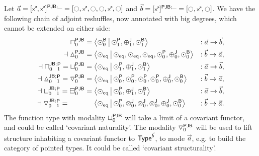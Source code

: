 \documentclass[a4paper]{memoir}
\begin{document}
\begin{example} \label{ex:pjb-paramty}
	Let $\vec a = \maskopypolar{[\ypolar, \ypolar]}{\maskpjb} = [\npolar, \ypolar, \npolar, \npolar, \ypolar, \npolar]$ and $\vec b = \maskopypolar{[\ypolar]}{\maskpjb} = [\npolar, \ypolar, \npolar]$.
	We have the following chain of adjoint reshuffles, now annotated with big degrees, which cannot be extended on either side:
	\begin{align*}
		\cohpi_0^{\maskopfont{PJB}} &= \reshlist{\nwbridgepol_0}{\nwpathpol_1, \nwpospol_1, \nwbridgepol_1} &: \vec a \to \vec b, \\
		\dashv
		\cohdisc_0^{\maskopfont{PJB}} &= \reshlist{\nonpol_\eqtydeg}{\nonpol_\eqtydeg, \nonpol_\eqtydeg, \nonpol_\eqtydeg, \nwpathpol_0, \nwpospol_0, \nwbridgepol_0} &: \vec b \to \vec a, \\
		\dashv
		\cohpi{}_0^{\maskopfont{JB};}{}_1^{\maskopfont{P}} =
		\cohfget_0^{\maskopfont{PJB}} &= \reshlist{\nonpol_\eqtydeg}{\nwpathpol_1, \nwpospol_1, \nwbridgepol_1} &: \vec a \to \vec b, \\
		\dashv
		\cohdisc{}_0^{\maskopfont{JB};}{}_1^{\maskopfont{P}} =
		\cohcodisc_0^{\maskopfont{PJB}} &= \reshlist{\nonpol_\eqtydeg}{\nwpathpol_0, \nwpathpol_0, \nwpathpol_0, \nwpathpol_0, \nwpospol_0, \nwbridgepol_0} &: \vec b \to \vec a, \\
		\dashv
		\cohfget{}_0^{\maskopfont{JB};}{}_1^{\maskopfont{P}} =
		\cohcopi_0^{\maskopfont{PJB}} &= 
		\reshlist{\nonpol_\eqtydeg}{\nwpathpol_0, \nwpospol_1, \nwbridgepol_1} &: \vec a \to \vec b, \\
		\dashv
		\cohcodisc{}_0^{\maskopfont{JB};}{}_1^{\maskopfont{P}} =
		\phantom{\cohcopi_0^{\maskopfont{PJB}}} &\mathrel{\phantom{=}} 
		\reshlist{\nonpol_\eqtydeg}{\nwpathpol_0, \nwmixpol_0, \nwmixpol_0, \nwmixpol_0, \nwpospol_0, \nwbridgepol_0} &: \vec b \to \vec a.
	\end{align*}
	The function type with modality ${\sqcup}_0^{\mathsf{PJB}}$ will take a limit of a covariant functor, and could be called `covariant naturality'.
	The modality ${\triangledown}_0^{\mathsf{PJB}}$ will be used to lift structure inhabiting a covariant functor to ${\mathsf{Type}}^{\vec b}$, to mode $\vec a$, e.g. to build the category of pointed types. It could be called `covariant structurality'.
\end{example}
\end{document}
